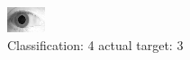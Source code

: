\begin{figure}[h!]
\begin{center}
\includegraphics[width=0.60\columnwidth]{figures/ID1900_class_4_target_3.png}
\end{center}
\caption{ Classification: 4 actual target: 3}
\label{fig:ID1900_class_4_target_3}
\end{figure}
